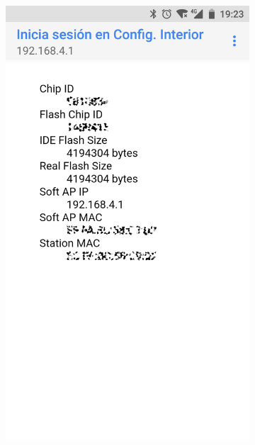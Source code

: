 \begin{figure}[b!]
\begin{subfigure}{0.49\columnwidth}
  \centering
  \includegraphics[width=1\columnwidth,frame]{images/interior-info}
  \caption{}
  \label{fig:interior-info}
\end{subfigure}
\hfill
\begin{subfigure}{0.49\columnwidth}
  \centering

\end{subfigure}
\end{figure}
